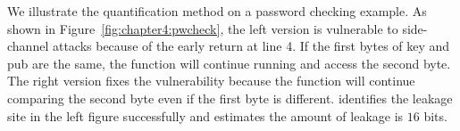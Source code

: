 We illustrate the quantification method on a password checking example.  As shown in Figure~\ref{fig:chapter4:pwcheck}, the left version is vulnerable to side-channel attacks because of the early return at line 4. If the first bytes of \textsf{key} and \textsf{pub} are the same, the function will continue running and access the second byte. The right version fixes the vulnerability because the function will continue comparing the second byte even if the first byte is different.  \tool{} identifies the leakage site in the left figure successfully and estimates the amount of leakage is $16$ bits. 


